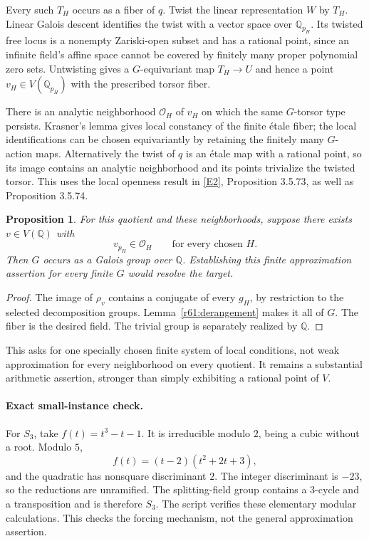 \documentclass[11pt,a4paper]{article}
\newcommand{\Q}{\mathbb{Q}}
\newcommand{\eref}[2]{\hyperlink{extra:#1:#2}{[E#2]}}
\newtheorem{notebookproposition}[notebooklemma]{Proposition}
\numberwithin{equation}{section}
\begin{document}
Every such $T_H$ occurs as a fiber of $q$. Twist the linear representation $W$ by $T_H$. Linear Galois descent identifies the twist with a vector space over $\Q_{p_H}$. Its twisted free locus is a nonempty Zariski-open subset and has a rational point, since an infinite field's affine space cannot be covered by finitely many proper polynomial zero sets. Untwisting gives a $G$-equivariant map $T_H\to U$ and hence a point $v_H\in V(\Q_{p_H})$ with the prescribed torsor fiber.

There is an analytic neighborhood $\mathcal O_H$ of $v_H$ on which the same $G$-torsor type persists. Krasner's lemma gives local constancy of the finite étale fiber; the local identifications can be chosen equivariantly by retaining the finitely many $G$-action maps. Alternatively the twist of $q$ is an étale map with a rational point, so its image contains an analytic neighborhood and its points trivialize the twisted torsor. This uses the local openness result in \eref{statement}{2}, Proposition 3.5.73, as well as Proposition 3.5.74.

\begin{notebookproposition}\label{r61:approx}
For this quotient and these neighborhoods, suppose there exists $v\in V(\Q)$ with
\begin{equation}\label{r61:wa}
 v_{p_H}\in\mathcal O_H\qquad\text{for every chosen }H.
\end{equation}
Then $G$ occurs as a Galois group over $\Q$. Establishing this finite approximation assertion for every finite $G$ would resolve the target.
\end{notebookproposition}
\begin{proof}
The image of $\rho_v$ contains a conjugate of every $g_H$, by restriction to the selected decomposition groups. Lemma~\ref{r61:derangement} makes it all of $G$. The fiber is the desired field. The trivial group is separately realized by $\Q$.
\end{proof}

This asks for one specially chosen finite system of local conditions, not weak approximation for every neighborhood on every quotient. It remains a substantial arithmetic assertion, stronger than simply exhibiting a rational point of $V$.

\paragraph{Exact small-instance check.}
For $S_3$, take $f(t)=t^3-t-1$. It is irreducible modulo $2$, being a cubic without a root. Modulo $5$,
\[
 f(t)=(t-2)(t^2+2t+3),
\]
and the quadratic has nonsquare discriminant $2$. The integer discriminant is $-23$, so the reductions are unramified. The splitting-field group contains a $3$-cycle and a transposition and is therefore $S_3$. The script verifies these elementary modular calculations. This checks the forcing mechanism, not the general approximation assertion.
\end{document}
